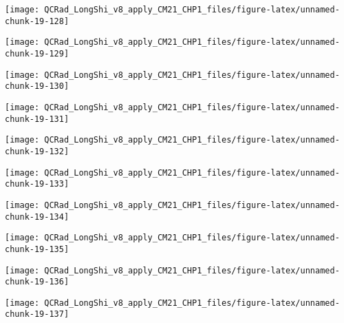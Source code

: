 \documentclass[
  10pt,
  a4paper,oneside]{article}
\begin{document}
\begin{center}\texttt{[image: QCRad\_LongShi\_v8\_apply\_CM21\_CHP1\_files/figure-latex/unnamed-chunk-19-128]} \end{center}

\begin{center}\texttt{[image: QCRad\_LongShi\_v8\_apply\_CM21\_CHP1\_files/figure-latex/unnamed-chunk-19-129]} \end{center}

\begin{center}\texttt{[image: QCRad\_LongShi\_v8\_apply\_CM21\_CHP1\_files/figure-latex/unnamed-chunk-19-130]} \end{center}

\begin{center}\texttt{[image: QCRad\_LongShi\_v8\_apply\_CM21\_CHP1\_files/figure-latex/unnamed-chunk-19-131]} \end{center}

\begin{center}\texttt{[image: QCRad\_LongShi\_v8\_apply\_CM21\_CHP1\_files/figure-latex/unnamed-chunk-19-132]} \end{center}

\begin{center}\texttt{[image: QCRad\_LongShi\_v8\_apply\_CM21\_CHP1\_files/figure-latex/unnamed-chunk-19-133]} \end{center}

\begin{center}\texttt{[image: QCRad\_LongShi\_v8\_apply\_CM21\_CHP1\_files/figure-latex/unnamed-chunk-19-134]} \end{center}

\begin{center}\texttt{[image: QCRad\_LongShi\_v8\_apply\_CM21\_CHP1\_files/figure-latex/unnamed-chunk-19-135]} \end{center}

\begin{center}\texttt{[image: QCRad\_LongShi\_v8\_apply\_CM21\_CHP1\_files/figure-latex/unnamed-chunk-19-136]} \end{center}

\begin{center}\texttt{[image: QCRad\_LongShi\_v8\_apply\_CM21\_CHP1\_files/figure-latex/unnamed-chunk-19-137]} \end{center}
\end{document}
